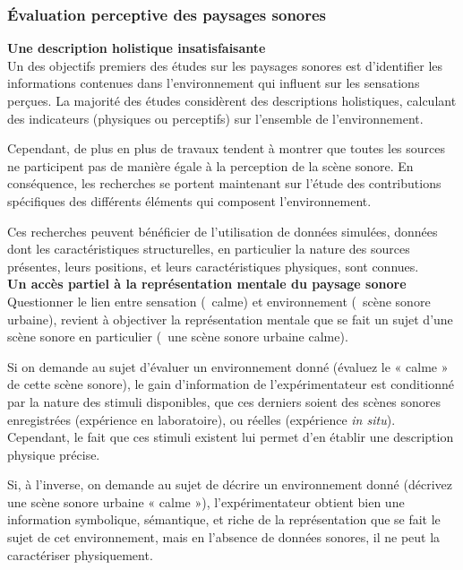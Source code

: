 \subsubsection{Évaluation perceptive des paysages sonores}

{\setlength{\parindent}{0cm}\textbf{Une description holistique insatisfaisante}}\\

Un des objectifs premiers des études sur les paysages sonores est d'identifier les informations contenues dans l'environnement qui influent sur les sensations perçues. La majorité des études considèrent des descriptions holistiques, calculant des indicateurs (physiques ou perceptifs) sur l'ensemble de l'environnement.

Cependant, de plus en plus de travaux tendent à montrer que toutes les sources ne participent pas de manière égale à la perception de la scène sonore. En conséquence, les recherches se portent maintenant sur l'étude des contributions spécifiques des différents éléments qui composent l'environnement.

Ces recherches peuvent bénéficier de l'utilisation de données simulées, données dont les caractéristiques structurelles, en particulier la nature des sources présentes, leurs positions, et leurs caractéristiques physiques, sont connues. \\

{\setlength{\parindent}{0cm}\textbf{Un accès partiel à la représentation mentale du paysage sonore}} \\

Questionner le lien entre sensation (\eg~calme) et environnement (\eg~scène sonore urbaine), revient à objectiver la représentation mentale que se fait un sujet d'une scène sonore en particulier (\eg~une scène sonore urbaine calme).

Si on demande au sujet d'évaluer un environnement donné (évaluez le « calme » de cette scène sonore), le gain d'information de l'expérimentateur est conditionné par la nature des stimuli disponibles, que ces derniers soient des scènes sonores enregistrées (expérience en laboratoire), ou réelles (expérience \emph{in situ}). Cependant, le fait que ces stimuli existent lui permet d'en établir une description physique précise.

Si, à l'inverse, on demande au sujet de décrire un environnement donné (décrivez une scène sonore urbaine « calme »), l'expérimentateur obtient bien une information symbolique, sémantique, et riche de la représentation que se fait le sujet de cet environnement, mais en l'absence de données sonores, il ne peut la caractériser physiquement.

